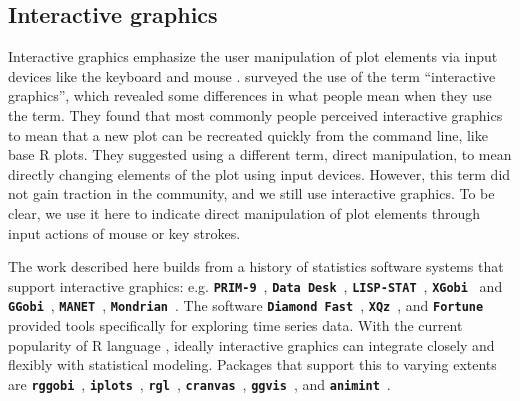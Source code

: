 \documentclass[12pt]{article}
\begin{document}

\subsection{Interactive graphics\label{sec:interactive-graphics}}

Interactive graphics emphasize the user manipulation of plot elements via input devices like the keyboard and mouse \citep{symanzik2012interactive}. \citet{swayne1999} surveyed the use of the term ``interactive graphics'', which revealed some differences in what people mean when they use the term. They found that most commonly people perceived interactive graphics to mean that a new plot can be recreated quickly from the command line, like base R plots. They suggested using a different term, direct manipulation, to mean directly changing elements of the plot using input devices. However, this term did not gain traction in the community, and we still use interactive graphics. To be clear, we use it here to indicate direct manipulation of plot elements through input actions of mouse or key strokes.

The work described here builds from a history of statistics software systems that support interactive graphics: e.g.
\texttt{\textbf{PRIM-9}}~\citep{fisherkeller1988prim},
\texttt{\textbf{Data Desk}}~\citep{velleman1988datadesk},
\texttt{\textbf{LISP-STAT}}~\citep{tierney1990lisp},
\texttt{\textbf{XGobi}}~\citep{swayne1998xgobi} and
\texttt{\textbf{GGobi}}~\citep{cook2007ggobi},
\texttt{\textbf{MANET}}~\citep{unwin1996manet},
\texttt{\textbf{Mondrian}}~\citep{theus2002mondrian}.
The software \texttt{\textbf{Diamond Fast}}~\citep{unwin1988eyeballing},
\texttt{\textbf{XQz}}~\citep{McDougall1994}, and \texttt{\textbf{Fortune}}~\citep{kotterfortune}  provided tools specifically for exploring time series data.
With the current popularity of R language \citep{Rlanguage}, ideally interactive graphics can
integrate closely and flexibly with statistical modeling. Packages that support this to varying extents are \texttt{\textbf{rggobi}}~\citep{rggobi},
\texttt{\textbf{iplots}}~\citep{iplots},
\texttt{\textbf{rgl}}~\citep{adler2003rgl},
\texttt{\textbf{cranvas}}~\citep{cranvas},
\texttt{\textbf{ggvis}}~\citep{ggvis},
and \texttt{\textbf{animint}}~\citep{animint}.
\end{document}
